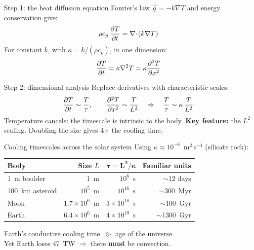 \documentclass[aspectratio=169, 11pt]{beamer}
\begin{document}
\begin{frame}{Step 1: the heat diffusion equation}
  Fourier's law $\vec{q} = -k\nabla T$ and energy conservation give:
  $$\rho c_p\,\frac{\partial T}{\partial t} = \nabla\!\cdot\!(k\nabla T)$$
  \vskip6pt
  For constant $k$, with $\kappa = k/(\rho c_p)$, in one dimension:
  $$\frac{\partial T}{\partial t} = \kappa \nabla^2 T = \kappa \frac{\partial ^2 T}{\partial x^2}$$
  \vskip6pt
\end{frame}

\begin{frame}{Step 2: dimensional analysis}
  Replace derivatives with characteristic scales:
  $$\frac{\partial T}{\partial t} \sim \frac{T}{\tau}, \qquad \frac{\partial ^2 T}{\partial x^2} \sim \frac{T}{L^2}
  \quad\Rightarrow\quad \frac{T}{\tau} \sim \kappa\,\frac{T}{L^2}$$
  \vskip4pt
  Temperature cancels: the timescale is intrinsic to the body.
  \vskip4pt
  \vskip4pt
  \textbf{Key feature:} the $L^2$ scaling. Doubling the size gives 4$\times$ the cooling time.
\end{frame}

\begin{frame}{Cooling timescales across the solar system}
  Using $\kappa \approx 10^{-6}$~m$^2$\,s$^{-1}$ (silicate rock):
  \vskip8pt
  \centering
  \begin{tabular}{l r r r}
    \toprule
    \textbf{Body} & \textbf{Size $L$} & $\boldsymbol{\tau = L^2/\kappa}$ & \textbf{Familiar units} \\
    \midrule
    1~m boulder  & 1~m               & $10^6$~s              & $\sim$12 days \\
    100~km asteroid & $10^5$~m        & $10^{16}$~s           & $\sim$300~Myr \\
    Moon         & $1.7 \times 10^6$~m & $3 \times 10^{18}$~s & $\sim$100~Gyr \\
    Earth        & $6.4 \times 10^6$~m & $4 \times 10^{19}$~s & $\sim$1300~Gyr \\
    \bottomrule
  \end{tabular}
  \vskip10pt
  \begin{alertblock}{}
    Earth's conductive cooling time $\gg$ age of the universe.\\
    Yet Earth loses 47~TW $\Rightarrow$ there \textbf{must} be convection.
  \end{alertblock}
\end{frame}
\end{document}
